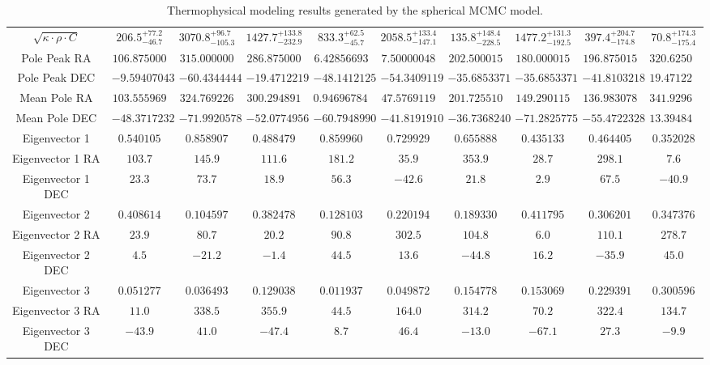 \begin{table}[H]
\begin{tabular}{c|c|c|c|c|c|c|c|c|c}
        $\sqrt{\kappa\cdot\rho\cdot C}$ & $206.5^{+77.2}_{-46.7}$ & $3070.8^{+96.7}_{-105.3}$ & $1427.7^{+133.8}_{-232.9}$ & $833.3^{+62.5}_{-45.7}$ & $2058.5^{+133.4}_{-147.1}$ & $135.8^{+148.4}_{-228.5}$ & $1477.2^{+131.3}_{-192.5}$ & $397.4^{+204.7}_{-174.8}$ & $70.8^{+174.3}_{-175.4}$ \\ 
        Pole Peak RA & $106.875000$ & $315.000000$ & $286.875000$ & $6.42856693$ & $7.50000048$ & $202.500015$ & $180.000015$ & $196.875015$ & $320.625000$ \\ 
        Pole Peak DEC & $-9.59407043$ & $-60.4344444$ & $-19.4712219$ & $-48.1412125$ & $-54.3409119$ & $-35.6853371$ & $-35.6853371$ & $-41.8103218$ & $19.4712200$ \\ 
        Mean Pole RA & $103.555969$ & $324.769226$ & $300.294891$ & $0.946967840$ & $47.5769119$ & $201.725510$ & $149.290115$ & $136.983078$ & $341.929626$ \\ 
        Mean Pole DEC & $-48.3717232$ & $-71.9920578$ & $-52.0774956$ & $-60.7948990$ & $-41.8191910$ & $-36.7368240$ & $-71.2825775$ & $-55.4722328$ & $13.3948460$ \\ 
        Eigenvector 1 & $0.540105$ & $0.858907$ & $0.488479$ & $0.859960$ & $0.729929$ & $0.655888$ & $0.435133$ & $0.464405$ & $0.352028$ \\ 
        Eigenvector 1 RA & $103.7$ & $145.9$ & $111.6$ & $181.2$ & $35.9$ & $353.9$ & $28.7$ & $298.1$ & $7.6$ \\ 
        Eigenvector 1 DEC & $23.3$ & $73.7$ & $18.9$ & $56.3$ & $-42.6$ & $21.8$ & $2.9$ & $67.5$ & $-40.9$ \\ 
        Eigenvector 2 & $0.408614$ & $0.104597$ & $0.382478$ & $0.128103$ & $0.220194$ & $0.189330$ & $0.411795$ & $0.306201$ & $0.347376$ \\ 
        Eigenvector 2 RA & $23.9$ & $80.7$ & $20.2$ & $90.8$ & $302.5$ & $104.8$ & $6.0$ & $110.1$ & $278.7$ \\ 
        Eigenvector 2 DEC & $4.5$ & $-21.2$ & $-1.4$ & $44.5$ & $13.6$ & $-44.8$ & $16.2$ & $-35.9$ & $45.0$ \\ 
        Eigenvector 3 & $0.051277$ & $0.036493$ & $0.129038$ & $0.011937$ & $0.049872$ & $0.154778$ & $0.153069$ & $0.229391$ & $0.300596$ \\ 
        Eigenvector 3 RA & $11.0$ & $338.5$ & $355.9$ & $44.5$ & $164.0$ & $314.2$ & $70.2$ & $322.4$ & $134.7$ \\ 
        Eigenvector 3 DEC & $-43.9$ & $41.0$ & $-47.4$ & $8.7$ & $46.4$ & $-13.0$ & $-67.1$ & $27.3$ & $-9.9$ \\ 
    \end{tabular}
    \caption{Thermophysical modeling results generated by the spherical MCMC model.}
\end{table}